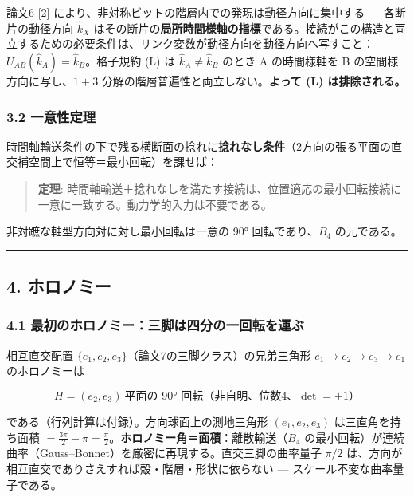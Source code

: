 \documentclass[
]{ltjsarticle}
\begin{document}
論文6 {[}2{]} により、非対称ビットの階層内での発現は動径方向に集中する
--- 各断片の動径方向 \(\hat k_X\)
はその断片の\textbf{局所時間様軸の指標}である。接続がこの構造と両立するための必要条件は、リンク変数が動径方向を動径方向へ写すこと：\(U_{AB}(\hat k_A)=\hat k_B\)。格子規約
(L) は \(\hat k_A\ne\hat k_B\) のとき A の時間様軸を B
の空間様方向に写し、\(1{+}3\)
分解の階層普遍性と両立しない。\textbf{よって (L) は排除される。}

\subsubsection{3.2 一意性定理}\label{ux4e00ux610fux6027ux5b9aux7406}

時間軸輸送条件の下で残る横断面の捻れに\textbf{捻れなし条件}（2方向の張る平面の直交補空間上で恒等＝最小回転）を課せば：

\begin{quote}
\textbf{定理}:
時間軸輸送＋捻れなしを満たす接続は、位置適応の最小回転接続に一意に一致する。動力学的入力は不要である。
\end{quote}

非対蹠な軸型方向対に対し最小回転は一意の 90° 回転であり、\(B_4\)
の元である。

\begin{center}\rule{0.5\linewidth}{0.5pt}\end{center}

\subsection{4. ホロノミー}\label{ux30dbux30edux30ceux30dfux30fc}

\subsubsection{4.1
最初のホロノミー：三脚は四分の一回転を運ぶ}\label{ux6700ux521dux306eux30dbux30edux30ceux30dfux30fcux4e09ux811aux306fux56dbux5206ux306eux4e00ux56deux8ee2ux3092ux904bux3076}

相互直交配置 \(\{e_1,e_2,e_3\}\)（論文7の三脚クラス）の兄弟三角形
\(e_1\to e_2\to e_3\to e_1\) のホロノミーは

\[
H=(e_2,e_3)\ \text{平面の }90°\text{ 回転（非自明、位数4、}\det=+1\text{）}
\]

である（行列計算は付録）。方向球面上の測地三角形 \((e_1,e_2,e_3)\)
は三直角を持ち面積
\(=\tfrac{3\pi}2-\pi=\tfrac\pi2\)。\textbf{ホロノミー角＝面積}：離散輸送（\(B_4\)
の最小回転）が連続曲率（Gauss--Bonnet）を厳密に再現する。直交三脚の曲率量子
\(\pi/2\) は、方向が相互直交でありさえすれば殻・階層・形状に依らない ---
スケール不変な曲率量子である。
\end{document}
